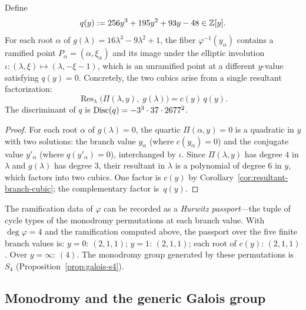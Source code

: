\begin{corollary}\label{cor:conjugate-cubic}
Define
\begin{equation}\label{eq:QLY}
q(y):=256y^3+195y^2+93y-48\in\mathbb{Z}[y].
\end{equation}
For each root $\alpha$ of $g(\lambda)=16\lambda^3-9\lambda^2+1$, the fiber $\varphi^{-1}(y_\alpha)$ contains a ramified point $P_\alpha=(\alpha,\xi_\alpha)$ and its image under the elliptic involution $\iota:(\lambda,\xi)\mapsto(\lambda,-\xi-1)$, which is an unramified point at a different $y$-value satisfying $q(y)=0$.
Concretely, the two cubics arise from a single resultant factorization:
\begin{equation}\label{eq:resultant-split}
\operatorname{Res}_\lambda\!\bigl(\Pi(\lambda,y),\;g(\lambda)\bigr)=c(y)\,q(y).
\end{equation}
The discriminant of $q$ is $\operatorname{Disc}(q)=-3^3\cdot 37\cdot 2677^2$.
\end{corollary}

\begin{proof}
For each root $\alpha$ of $g(\lambda)=0$, the quartic $\Pi(\alpha,y)=0$ is a quadratic in $y$ with two solutions: the branch value $y_\alpha$ (where $c(y_\alpha)=0$) and the conjugate value $y'_\alpha$ (where $q(y'_\alpha)=0$), interchanged by $\iota$.
Since $\Pi(\lambda,y)$ has degree $4$ in $\lambda$ and $g(\lambda)$ has degree $3$, their resultant in $\lambda$ is a polynomial of degree $6$ in $y$, which factors into two cubics.
One factor is $c(y)$ by Corollary~\ref{cor:resultant-branch-cubic}; the complementary factor is~$q(y)$.
\end{proof}

\begin{remark}\label{rmk:hurwitz}
The ramification data of $\varphi$ can be recorded as a \emph{Hurwitz passport}---the tuple of cycle types of the monodromy permutations at each branch value.
With $\deg\varphi=4$ and the ramification computed above, the passport over the five finite branch values is:
$y=0$: $(2,1,1)$; $y=1$: $(2,1,1)$; each root of $c(y)$: $(2,1,1)$.
Over $y=\infty$: $(4)$.
The monodromy group generated by these permutations is $S_4$ (Proposition~\ref{prop:galois-s4}).
\end{remark}

\subsection{Monodromy and the generic Galois group}

